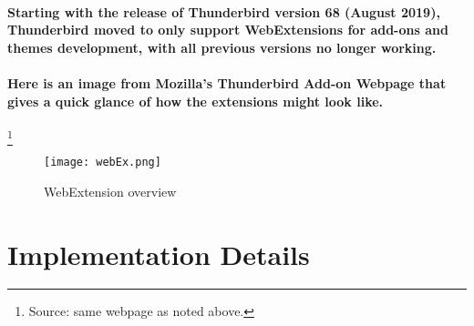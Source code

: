 \paragraph{Starting with the release of Thunderbird version 68 (August 2019), Thunderbird moved to only support WebExtensions for add-ons and themes development, with all previous versions no longer working.}

\paragraph{Here is an image from Mozilla's Thunderbird Add-on Webpage that gives a quick glance of how the extensions might look like.}\footnote{Source: same webpage as noted above.}


\begin{figure}[H]
\centering
\texttt{[image: webEx.png]}
\caption{\label{fig: webEx} WebExtension overview}
\end{figure}


\section{Implementation Details}

